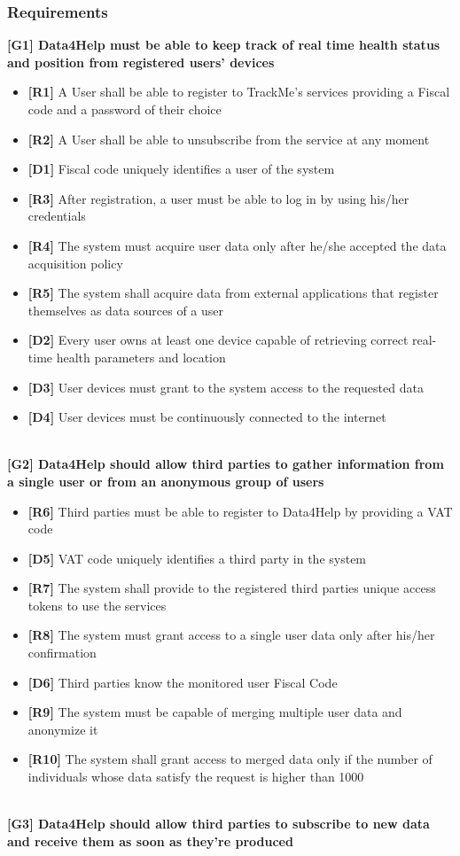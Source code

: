 \subsubsection{Requirements}
\textbf{[G1] Data4Help must be able to keep track of real time health status and position from registered users' devices}
\begin{itemize}
	\item \textbf{[R1]} A User shall be able to register to TrackMe's services providing a Fiscal code and a password of their choice
	\item \textbf{[R2]} A User shall be able to unsubscribe from the service at any moment
	\item \textbf{[D1]} Fiscal code uniquely identifies a user of the system
	\item \textbf{[R3]} After registration, a user must be able to log in by using his/her credentials
	\item \textbf{[R4]} The system must acquire user data only after he/she accepted the data acquisition policy
	\item \textbf{[R5]} The system shall acquire data from external applications that register themselves as data sources of a user
	\item \textbf{[D2]} Every user owns at least one device capable of retrieving correct real-time health parameters and location
	\item \textbf{[D3]} User devices must grant to the system access to the requested data
	\item \textbf{[D4]} User devices must be continuously connected to the internet
\end{itemize}
\\
\textbf{[G2] Data4Help should allow third parties to gather information from a single user or from an anonymous group of users}
\begin{itemize}
	\item \textbf{[R6]} Third parties must be able to register to Data4Help by providing a VAT code
	\item \textbf{[D5]} VAT code uniquely identifies a third party in the system
	\item \textbf{[R7]} The system shall provide to the registered third parties unique access tokens to use the services
	\item \textbf{[R8]} The system must grant access to a single user data only after his/her confirmation
	\item \textbf{[D6]} Third parties know the monitored user Fiscal Code
	\item \textbf{[R9]} The system must be capable of merging multiple user data and anonymize it
	\item \textbf{[R10]} The system shall grant access to merged data only if the number	of individuals	whose data satisfy the request is higher than	 1000
\end{itemize}
\\
\textbf{[G3] Data4Help should allow third parties to subscribe to new data and receive them as soon as they're produced}

